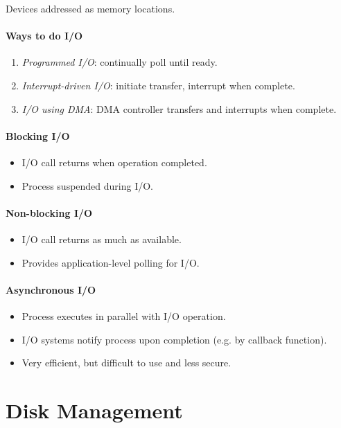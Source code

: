\documentclass[twocolumn,english]{article}
\begin{document}
Devices addressed as memory locations.

\paragraph{Ways to do I/O}
\begin{enumerate}
\item \emph{Programmed I/O}: continually poll until ready.
\item \emph{Interrupt-driven I/O}: initiate transfer, interrupt when complete.
\item \emph{I/O using DMA}: DMA controller transfers and interrupts when
complete.
\end{enumerate}

\paragraph{Blocking I/O}
\begin{itemize}
\item I/O call returns when operation completed.
\item Process suspended during I/O.
\end{itemize}

\paragraph{Non-blocking I/O}
\begin{itemize}
\item I/O call returns as much as available.
\item Provides application-level polling for I/O.
\end{itemize}

\paragraph{Asynchronous I/O}
\begin{itemize}
\item Process executes in parallel with I/O operation.
\item I/O systems notify process upon completion (e.g. by callback function).
\item Very efficient, but difficult to use and less secure.
\end{itemize}

\section{Disk Management}
\end{document}

